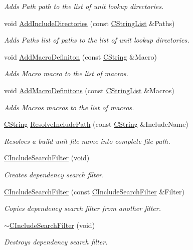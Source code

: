 \begin{DoxyCompactItemize}
\begin{DoxyCompactList}\small\item\em Adds {\itshape Path} path to the list of unit lookup directories. \end{DoxyCompactList}\item 
void \hyperlink{classCIncludeSearchFilter_a7d91b0a6d6bb3b0dacca02a47f0bc1d2}{Add\-Include\-Directories} (const \hyperlink{classCStringList}{C\-String\-List} \&Paths)
\begin{DoxyCompactList}\small\item\em Adds {\itshape Paths} list of paths to the list of unit lookup directories. \end{DoxyCompactList}\item 
void \hyperlink{classCIncludeSearchFilter_a1f9de2b494d146bc2df210c7524c153b}{Add\-Macro\-Definiton} (const \hyperlink{classCString}{C\-String} \&Macro)
\begin{DoxyCompactList}\small\item\em Adds {\itshape Macro} macro to the list of macros. \end{DoxyCompactList}\item 
void \hyperlink{classCIncludeSearchFilter_ab5bd5e9e177f90b6bbe29d4a4ea83f41}{Add\-Macro\-Definitons} (const \hyperlink{classCStringList}{C\-String\-List} \&Macros)
\begin{DoxyCompactList}\small\item\em Adds {\itshape Macros} macros to the list of macros. \end{DoxyCompactList}\item 
\hyperlink{classCString}{C\-String} \hyperlink{classCIncludeSearchFilter_a89c3d026fb68931212d397dff94ede64}{Resolve\-Include\-Path} (const \hyperlink{classCString}{C\-String} \&Include\-Name)
\begin{DoxyCompactList}\small\item\em Resolves a build unit file name into complete file path. \end{DoxyCompactList}\item 
\hyperlink{classCIncludeSearchFilter_ab3fbb998a1ff29e3c33e5bb296780bec}{C\-Include\-Search\-Filter} (void)
\begin{DoxyCompactList}\small\item\em Creates dependency search filter. \end{DoxyCompactList}\item 
\hyperlink{classCIncludeSearchFilter_ae38d64230ed0a36bce60b0e4a3a9759e}{C\-Include\-Search\-Filter} (const \hyperlink{classCIncludeSearchFilter}{C\-Include\-Search\-Filter} \&Filter)
\begin{DoxyCompactList}\small\item\em Copies dependency search filter from another filter. \end{DoxyCompactList}\item 
\hyperlink{classCIncludeSearchFilter_a54b44f1662a196e45d49d2155ba3eef2}{$\sim$\-C\-Include\-Search\-Filter} (void)
\begin{DoxyCompactList}\small\item\em Destroys dependency search filter. \end{DoxyCompactList}\end{DoxyCompactItemize}
